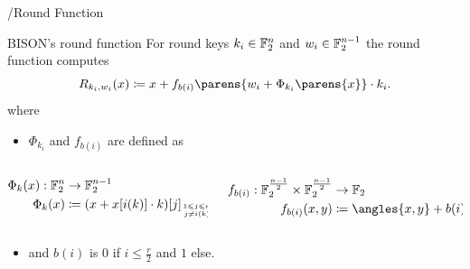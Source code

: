 \begin{frame}{\bison/}{Round Function}
    \vspace{-45pt}
    \begin{minipage}[t][150pt][t]{0.985\textwidth}
        \begin{block}{BISON's round function\vpPp}
            \centering
            \vspace{0.5\baselineskip}
            For round keys $k_i\in \mathbb{F}_2^n$ and $w_i\in \mathbb{F}_2^{n-1}$ the round function computes
            \begin{equation*}
                R_{k_i, w_i}(x) \coloneqq x + f_{b(i)} \parens{w_i + \Phi_{k_i}\parens{x}} \cdot k_i.
            \end{equation*}
            \flushleft
            where
            \begin{itemize}
                \item $\Phi_{k_i}$ and $f_{b(i)}$ are defined as
            \end{itemize}
            \vspace{-10pt}
            \begin{columns}
                \begin{column}{0.49\textwidth}
                    \begin{align*}
                        \Phi_k(x) : \F_2^n &\to \F_2^{n-1} \\
                        \Phi_k(x) &\coloneqq (x + x[i(k)] \cdot k)[j]_{\tower{1 \leqslant j \leqslant n}{j \neq i(k)}}
                    \end{align*}
                \end{column}
                \begin{column}{0.49\textwidth}
                    \begin{align*}
                        f_{b(i)} : \F_2^{\frac{n-1}{2}}\times \F_2^{\frac{n-1}{2}} &\to \F_2 \\
                        f_{b(i)}(x,y) &\coloneqq \angles{x,y} + b(i),
                    \end{align*}
                \end{column}
            \end{columns}
            \begin{itemize}
                \item and $b(i)$ is $0$ if $i \leqslant \frac{r}{2}$ and $1$ else.
            \end{itemize}
            \vspace{-0.25\baselineskip}
        \end{block}
    \end{minipage}
\end{frame}

